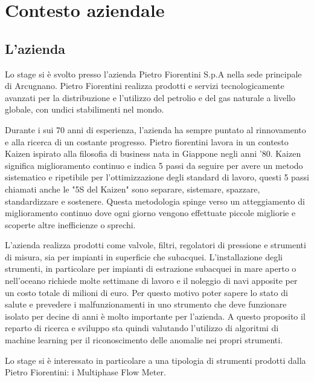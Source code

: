 
\chapter{Contesto aziendale}

\section{L'azienda}
Lo stage si è svolto presso l'azienda Pietro Fiorentini S.p.A nella sede principale di Arcugnano. Pietro Fiorentini realizza prodotti e servizi tecnologicamente avanzati per la distribuzione e l'utilizzo del petrolio e del gas naturale a livello globale, con undici stabilimenti nel mondo.

Durante i sui 70 anni di esperienza, l'azienda ha sempre puntato al rinnovamento e alla ricerca di un costante progresso. Pietro fiorentini lavora in un contesto Kaizen ispirato alla filosofia di business nata in Giappone negli anni '80. Kaizen significa miglioramento continuo e indica 5 passi da seguire per avere un metodo sistematico e ripetibile per l'ottimizzazione degli standard di lavoro, questi 5 passi chiamati anche le "5S del Kaizen" sono separare, sistemare, spazzare, standardizzare e sostenere. Questa metodologia spinge verso un atteggiamento di miglioramento continuo dove ogni giorno vengono effettuate piccole migliorie e scoperte altre inefficienze o sprechi.

L'azienda realizza prodotti come valvole, filtri, regolatori di pressione e strumenti di misura, sia per impianti in superficie che subacquei. L'installazione degli strumenti, in particolare per impianti di estrazione subacquei in mare aperto o nell'oceano richiede molte settimane di lavoro e il noleggio di navi apposite per un costo totale di milioni di euro. Per questo motivo poter sapere lo stato di salute e prevedere i malfunzionamenti in uno strumento che deve funzionare isolato per decine di anni è molto importante per l'azienda. A questo proposito il reparto di ricerca e sviluppo sta quindi valutando l'utilizzo di algoritmi di machine learning per il riconoscimento delle anomalie nei propri strumenti. 

Lo stage si è interessato in particolare a una tipologia di strumenti prodotti dalla Pietro Fiorentini: i Multiphase Flow Meter.


